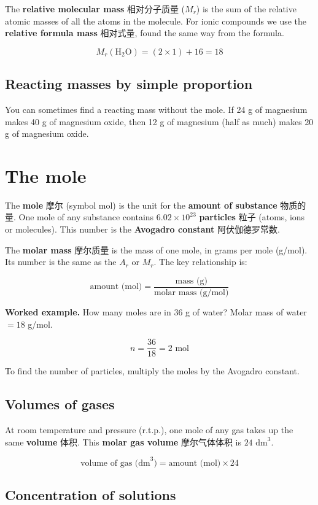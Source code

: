 \documentclass[11pt]{article}
\begin{document}
The \textbf{relative molecular mass} 相对分子质量 ($M_r$) is the sum of the relative atomic masses of all the atoms in the molecule. For ionic compounds we use the \textbf{relative formula mass} 相对式量, found the same way from the formula.

\[
M_r(\text{H}_2\text{O}) = (2 \times 1) + 16 = 18
\]

\subsection*{Reacting masses by simple proportion}

You can sometimes find a reacting mass without the mole. If 24 g of magnesium makes 40 g of magnesium oxide, then 12 g of magnesium (half as much) makes 20 g of magnesium oxide.

\section*{The mole}

The \textbf{mole} 摩尔 (symbol mol) is the unit for the \textbf{amount of substance} 物质的量. One mole of any substance contains $6.02 \times 10^{23}$ \textbf{particles} 粒子 (atoms, ions or molecules). This number is the \textbf{Avogadro constant} 阿伏伽德罗常数.

The \textbf{molar mass} 摩尔质量 is the mass of one mole, in grams per mole (g/mol). Its number is the same as the $A_r$ or $M_r$. The key relationship is:

\[
\text{amount (mol)} = \frac{\text{mass (g)}}{\text{molar mass (g/mol)}}
\]

\textbf{Worked example.} How many moles are in 36 g of water? Molar mass of water $= 18$ g/mol.

\[
n = \frac{36}{18} = 2 \text{ mol}
\]

To find the number of particles, multiply the moles by the Avogadro constant.

\subsection*{Volumes of gases}

At room temperature and pressure (r.t.p.), one mole of any gas takes up the same \textbf{volume} 体积. This \textbf{molar gas volume} 摩尔气体体积 is $24 \text{ dm}^3$.

\[
\text{volume of gas (dm}^3) = \text{amount (mol)} \times 24
\]

\subsection*{Concentration of solutions}
\end{document}
